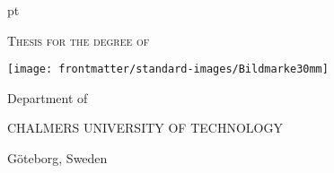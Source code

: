 {
 pt
\centering
\thispagestyle{empty}         %

{\small\scshape Thesis for the degree of 
}

\vspace{10 pc}

{\LARGE \thesistitle}
\vskip 1pc

{\large \thesissubtitle}
\vspace{2 pc}

{\large \thesisauthor}

\vfill

\texttt{[image: frontmatter/standard-images/Bildmarke30mm]}

\vspace{1cm}

Department of \thesisdepartment

{\scshape CHALMERS UNIVERSITY OF TECHNOLOGY}

Göteborg, Sweden \thesisyear

\clearpage
}
